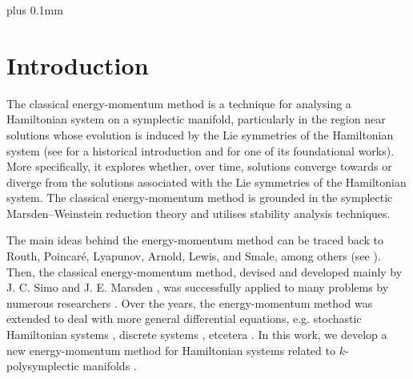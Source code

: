 \documentclass[11pt]{article}
\theoremstyle{plain}
\theoremstyle{definition}
\numberwithin{equation}{section}
\begin{document}
\bigskip




\newpage

{\setcounter{tocdepth}{2}
\def\baselinestretch{1}
\small
\def\addvspace#1{\vskip 1pt}
\parskip 0pt plus 0.1mm
\tableofcontents
}



\pagestyle{myheadings}


\section{Introduction}

The classical energy-momentum method is a technique for analysing a Hamiltonian system on a symplectic manifold, particularly in the region near solutions whose evolution is induced by the Lie symmetries of the Hamiltonian system (see \cite{Blo_15} for a historical introduction and \cite{MS_88} for one of its foundational works). More specifically, it explores whether, over time, solutions converge towards or diverge from the solutions associated with the Lie symmetries of the Hamiltonian system. The classical energy-momentum method is grounded in the symplectic Marsden--Weinstein reduction theory and utilises stability analysis techniques. 

The main ideas behind the energy-momentum method can be traced back to Routh, Poincar\'e, Lyapunov, Arnold, Lewis, and Smale, among others (see \cite[Section 3.14]{Blo_15}). Then,
the classical energy-momentum method, devised and developed mainly by J. C. Simo and J. E. Marsden \cite{MS_88}, was successfully applied to many problems by numerous researchers \cite{AH_87, MPS_90, MR_99, MSLP_89, OPR_05, SLM_91, ZBM_98}. Over the years, the energy-momentum method was extended to deal with more general differential equations, e.g. stochastic Hamiltonian systems \cite{BZ_14}, discrete systems \cite{MR_99,ST_92}, etcetera  \cite{WK_92}. In this work, we develop a new energy-momentum method for Hamiltonian systems related to $k$-polysymplectic manifolds \cite{Awa_92,LMS_88}. 
\end{document}
